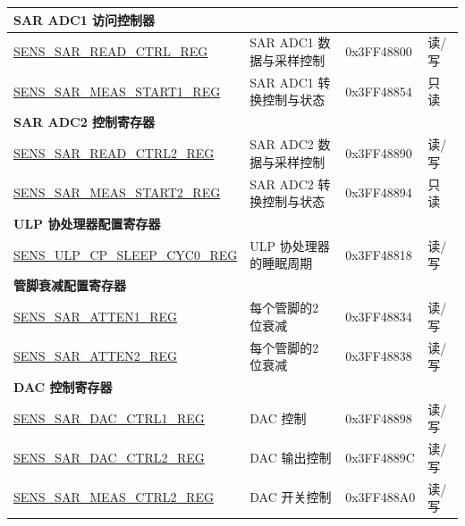 \begin{longtable}{ |p{6cm}|p{5cm}|p{2cm}|p{2cm}| }
\multicolumn{4}{|l|}{\textbf{SAR ADC1 访问控制器}} \\ \hline
\hyperref[regdesc:SENSSARREADCTRLREG]{SENS\_SAR\_READ\_CTRL\_REG} & SAR ADC1 数据与采样控制 & 0x3FF48800 & 读/写 \\ \hline
\hyperref[regdesc:SENSSARMEASSTART1REG]{SENS\_SAR\_MEAS\_START1\_REG} & SAR ADC1 转换控制与状态 & 0x3FF48854 & 只读 \\ \hline
\multicolumn{4}{|l|}{\textbf{SAR ADC2 控制寄存器}} \\ \hline
\hyperref[regdesc:SENSSARREADCTRL2REG]{SENS\_SAR\_READ\_CTRL2\_REG} & SAR ADC2 数据与采样控制 & 0x3FF48890 & 读/写 \\ \hline
\hyperref[regdesc:SENSSARMEASSTART2REG]{SENS\_SAR\_MEAS\_START2\_REG} & SAR ADC2 转换控制与状态 & 0x3FF48894 & 只读 \\ \hline
\multicolumn{4}{|l|}{\textbf{ULP 协处理器配置寄存器}} \\ \hline
\hyperref[regdesc:SENSULPCPSLEEPCYC0REG]{SENS\_ULP\_CP\_SLEEP\_CYC0\_REG} & ULP 协处理器的睡眠周期 & 0x3FF48818 & 读/写 \\ \hline
\multicolumn{4}{|l|}{\textbf{管脚衰减配置寄存器}} \\ \hline
\hyperref[regdesc:SENSSARATTEN1REG]{SENS\_SAR\_ATTEN1\_REG} & 每个管脚的2 位衰减 & 0x3FF48834 & 读/写 \\ \hline
\hyperref[regdesc:SENSSARATTEN2REG]{SENS\_SAR\_ATTEN2\_REG} & 每个管脚的2 位衰减 & 0x3FF48838 & 读/写 \\ \hline
\multicolumn{4}{|l|}{\textbf{DAC 控制寄存器}} \\ \hline
\hyperref[regdesc:SENSSARDACCTRL1REG]{SENS\_SAR\_DAC\_CTRL1\_REG} & DAC 控制 & 0x3FF48898 & 读/写 \\ \hline
\hyperref[regdesc:SENSSARDACCTRL2REG]{SENS\_SAR\_DAC\_CTRL2\_REG} & DAC 输出控制 & 0x3FF4889C & 读/写 \\ \hline
\hyperref[regdesc:SENSSARMEASCTRL2REG]{SENS\_SAR\_MEAS\_CTRL2\_REG} & DAC 开关控制 & 0x3FF488A0 & 读/写 \\ \hline
\end{longtable}

